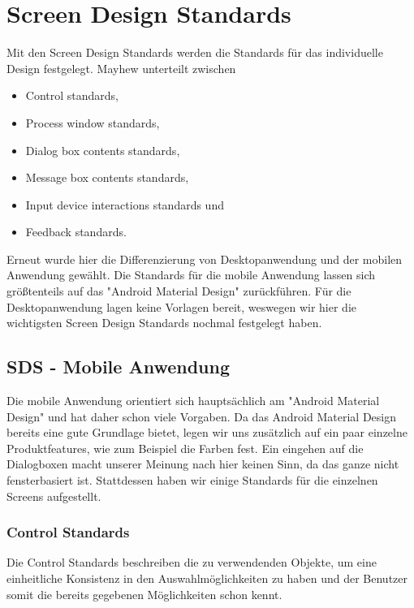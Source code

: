 \chapter{Screen Design Standards}\label{sds}
Mit den Screen Design Standards werden die Standards für das individuelle Design festgelegt. Mayhew unterteilt zwischen
\begin{itemize}
\item Control standards,
\item Process window standards,
\item Dialog box contents standards,
\item Message box contents standards,
\item Input device interactions standards und
\item Feedback standards.
\end{itemize}

Erneut wurde hier die Differenzierung von Desktopanwendung und der mobilen Anwendung gewählt. Die Standards für die mobile Anwendung lassen sich größtenteils auf das "Android Material Design" zurückführen. Für die Desktopanwendung lagen keine Vorlagen bereit, weswegen wir hier die wichtigsten Screen Design Standards nochmal festgelegt haben. 

\section{SDS - Mobile Anwendung}
Die mobile Anwendung orientiert sich hauptsächlich am "Android Material Design" und hat daher schon viele Vorgaben. Da das Android Material Design bereits eine gute Grundlage bietet, legen wir uns zusätzlich auf ein paar einzelne Produktfeatures, wie zum Beispiel die Farben fest. Ein eingehen auf die Dialogboxen macht unserer Meinung nach hier keinen Sinn, da das ganze nicht fensterbasiert ist. Stattdessen haben wir einige Standards für die einzelnen Screens aufgestellt.

\subsection{Control Standards}
Die Control Standards beschreiben die zu verwendenden Objekte, um eine einheitliche Konsistenz in den Auswahlmöglichkeiten zu haben und der Benutzer somit die bereits gegebenen Möglichkeiten schon kennt.


